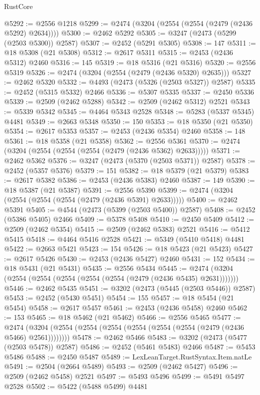 \begin{lexlean}{RustCore}
\begin{coremodule}
@5292 := @2556 @1218
@5299 := @2474 (@3204 (@2554 (@2554 (@2479 (@2436 @5292) @2634))))
@5300 := @2462 @5292
@5305 := @3247 (@2473 (@5299 (@2503 @5300)) @2587)
@5307 := @2452 (@5291 @5305)
@5308 := 147
@5311 := @18 @5308 (@21 @5308)
@5312 := @2617 @5311
@5315 := @2453 (@2436 @5312) @2460
@5316 := 145
@5319 := @18 @5316 (@21 @5316)
@5320 := @2556 @5319
@5326 := @2474 (@3204 (@2554 (@2479 (@2436 @5320) @2635)))
@5327 := @2462 @5320
@5332 := @4493 (@2473 (@5326 (@2503 @5327)) @2587)
@5335 := @2452 (@5315 @5332) @2466
@5336 := @5307 @5335
@5337 := @2450 @5336
@5339 := @2509 (@2462 @5288)
@5342 := @2509 (@2462 @5312) @2521
@5343 := @5339 @5342
@5345 := @4464 @5343 @2528
@5348 := @5283 (@5337 @5345) @4481
@5349 := @2663 @5348
@5350 := 150
@5353 := @18 @5350 (@21 @5350)
@5354 := @2617 @5353
@5357 := @2453 (@2436 @5354) @2460
@5358 := 148
@5361 := @18 @5358 (@21 @5358)
@5362 := @2556 @5361
@5370 := @2474 (@3204 (@2554 (@2554 (@2554 (@2479 (@2436 @5362) @2633)))))
@5371 := @2462 @5362
@5376 := @3247 (@2473 (@5370 (@2503 @5371)) @2587)
@5378 := @2452 (@5357 @5376)
@5379 := 151
@5382 := @18 @5379 (@21 @5379)
@5383 := @2617 @5382
@5386 := @2453 (@2436 @5383) @2460
@5387 := 149
@5390 := @18 @5387 (@21 @5387)
@5391 := @2556 @5390
@5399 := @2474 (@3204 (@2554 (@2554 (@2554 (@2479 (@2436 @5391) @2633)))))
@5400 := @2462 @5391
@5405 := @4544 (@2473 (@5399 (@2503 @5400)) @2587)
@5408 := @2452 (@5386 @5405) @2466
@5409 := @5378 @5408
@5410 := @2450 @5409
@5412 := @2509 (@2462 @5354)
@5415 := @2509 (@2462 @5383) @2521
@5416 := @5412 @5415
@5418 := @4464 @5416 @2528
@5421 := @5349 (@5410 @5418) @4481
@5422 := @2663 @5421
@5423 := 154
@5426 := @18 @5423 (@21 @5423)
@5427 := @2617 @5426
@5430 := @2453 (@2436 @5427) @2460
@5431 := 152
@5434 := @18 @5431 (@21 @5431)
@5435 := @2556 @5434
@5445 := @2474 (@3204 (@2554 (@2554 (@2554 (@2554 (@2554 (@2479 (@2436 @5435) @2631)))))))
@5446 := @2462 @5435
@5451 := @3202 (@2473 (@5445 (@2503 @5446)) @2587)
@5453 := @2452 (@5430 @5451)
@5454 := 155
@5457 := @18 @5454 (@21 @5454)
@5458 := @2617 @5457
@5461 := @2453 (@2436 @5458) @2460
@5462 := 153
@5465 := @18 @5462 (@21 @5462)
@5466 := @2556 @5465
@5477 := @2474 (@3204 (@2554 (@2554 (@2554 (@2554 (@2554 (@2554 (@2479 (@2436 @5466) @2561))))))))
@5478 := @2462 @5466
@5483 := @3202 (@2473 (@5477 (@2503 @5478)) @2587)
@5486 := @2452 (@5461 @5483) @2466
@5487 := @5453 @5486
@5488 := @2450 @5487
@5489 := LexLeanTarget.RustSyntax.Item.natLe
@5491 := @2504 (@2664 @5489)
@5493 := @2509 (@2462 @5427)
@5496 := @2509 (@2462 @5458) @2521
@5497 := @5493 @5496
@5499 := @5491 @5497 @2528
@5502 := @5422 (@5488 @5499) @4481

\end{coremodule}
\end{lexlean}
